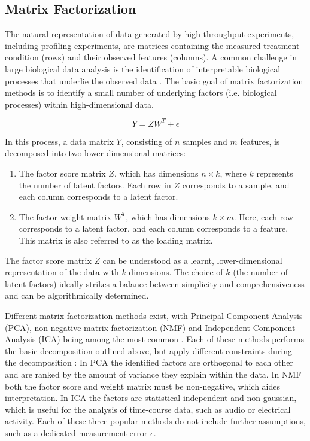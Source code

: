 \begin{flushleft}
\subsection{Matrix Factorization}
The natural representation of data generated by high-throughput experiments, including profiling experiments, are matrices containing the measured treatment condition (rows) and their observed features (columns). A common challenge in large biological data analysis is the identification of interpretable biological processes that underlie the observed data \parencite{stein-obrienEnterMatrixFactorization2018}. The basic goal of matrix factorization methods is to identify a small number of underlying factors (i.e. biological processes) within high-dimensional data. 

\begin{equation}
    Y = ZW^T + \epsilon
\end{equation}

In this process, a data matrix \( Y \), consisting of \( n \) samples and \( m \) features, is decomposed into two lower-dimensional matrices: 

\begin{enumerate}
    \item The factor score matrix \( Z \), which has dimensions \( n \times k \), where \( k \) represents the number of latent factors. Each row in \( Z \) corresponds to a sample, and each column corresponds to a latent factor.
    \item The factor weight matrix \( W^T \), which has dimensions \( k \times m \). Here, each row corresponds to a latent factor, and each column corresponds to a feature. This matrix is also referred to as the loading matrix. 
\end{enumerate}

The factor score matrix \( Z \) can be understood as a learnt, lower-dimensional representation of the data with \( k \) dimensions. The choice of \( k \) (the number of latent factors) ideally strikes a balance between simplicity and comprehensiveness and can be algorithmically determined. 

Different matrix factorization methods exist, with Principal Component Analysis (PCA), non-negative matrix factorization (NMF) and Independent Component Analysis (ICA) being among the most common \parencite{stein-obrienEnterMatrixFactorization2018}. Each of these methods performs the basic decomposition outlined above, but apply different constraints during the decomposition \parencite{stein-obrienEnterMatrixFactorization2018}: In PCA the identified factors are orthogonal to each other and are ranked by the amount of variance they explain within the data. In NMF both the factor score and weight matrix must be non-negative, which aides interpretation. In ICA the factors are statistical independent and non-gaussian, which is useful for the analysis of time-course data, such as audio or electrical activity. Each of these three popular methods do not include further assumptions, such as a dedicated measurement error \(\epsilon\).


\end{flushleft}
